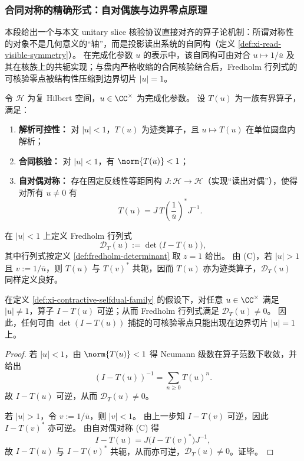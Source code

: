 \subsubsection{合同对称的精确形式：自对偶族与边界零点原理}\label{subsec:xi-contractive-symmetry-boundary-zero}
本段给出一个与本文 unitary slice 核验协议直接对齐的算子论机制：所谓对称性的对象不是几何意义的“轴”，而是投影读出系统的自同构（定义 \ref{def:xi-read-visible-symmetry}）。
在完成化参数 \(u\) 的表示中，该自同构可由对合 \(u\mapsto 1/\overline u\) 及其在核族上的共轭实现；与盘内严格收缩的合同核验结合后，Fredholm 行列式的可核验零点被结构性压缩到边界切片 \(|u|=1\)。
\par

\begin{definition}\label{def:xi-contractive-selfdual-family}
令 \(\mathcal{H}\) 为复 Hilbert 空间，\(u\in\CC^\times\) 为完成化参数。
设 \(T(u)\) 为一族有界算子，满足：
\begin{enumerate}
  \item[\textbf{(A)}] \textbf{解析可控性：}
  对 \(|u|<1\)，\(T(u)\) 为迹类算子，且 \(u\mapsto T(u)\) 在单位圆盘内解析；
  \item[\textbf{(B)}] \textbf{合同核验：}
  对 \(|u|<1\)，有 \(\norm{T(u)}<1\)；
  \item[\textbf{(C)}] \textbf{自对偶对称：}
  存在固定反线性等距同构 \(J:\mathcal{H}\to\mathcal{H}\)（实现“读出对偶”），使得对所有 \(u\neq 0\) 有
  \[
  T(u)=J\,T\!\left(\frac{1}{\overline u}\right)^{*}J^{-1}.
  \]
\end{enumerate}
在 \(|u|<1\) 上定义 Fredholm 行列式
\[
\mathcal{D}_T(u):=\det\!\bigl(I-T(u)\bigr),
\]
其中行列式按定义 \ref{def:fredholm-determinant} 取 \(z=1\) 给出。
由 (C)，若 \(|u|>1\) 且 \(v:=1/\overline u\)，则 \(T(u)\) 与 \(T(v)^{*}\) 共轭，因而 \(T(u)\) 亦为迹类算子，\(\mathcal{D}_T(u)\) 同样定义良好。
\end{definition}

\begin{theorem}[合同对称的边界零点原理]\label{thm:xi-contractive-boundary-zero}
在定义 \ref{def:xi-contractive-selfdual-family} 的假设下，对任意 \(u\in\CC^\times\) 满足 \(|u|\neq 1\)，算子 \(I-T(u)\) 可逆；从而 Fredholm 行列式满足 \(\mathcal{D}_T(u)\neq 0\)。
因此，任何可由 \(\det(I-T(u))\) 捕捉的可核验零点只能出现在边界切片 \(|u|=1\) 上。
\end{theorem}

\begin{proof}
若 \(|u|<1\)，由 \(\norm{T(u)}<1\) 得 Neumann 级数在算子范数下收敛，并给出
\[
(I-T(u))^{-1}=\sum_{n\ge 0}T(u)^{n}.
\]
故 \(I-T(u)\) 可逆，从而 \(\mathcal{D}_T(u)\neq 0\)。
\par
若 \(|u|>1\)，令 \(v:=1/\overline u\)，则 \(|v|<1\)。
由上一步知 \(I-T(v)\) 可逆，因此 \(I-T(v)^{*}\) 亦可逆。
由自对偶对称 (C) 得
\[
I-T(u)=J\bigl(I-T(v)^{*}\bigr)J^{-1},
\]
故 \(I-T(u)\) 与 \(I-T(v)^{*}\) 共轭，从而亦可逆，\(\mathcal{D}_T(u)\neq 0\)。证毕。
\end{proof}

